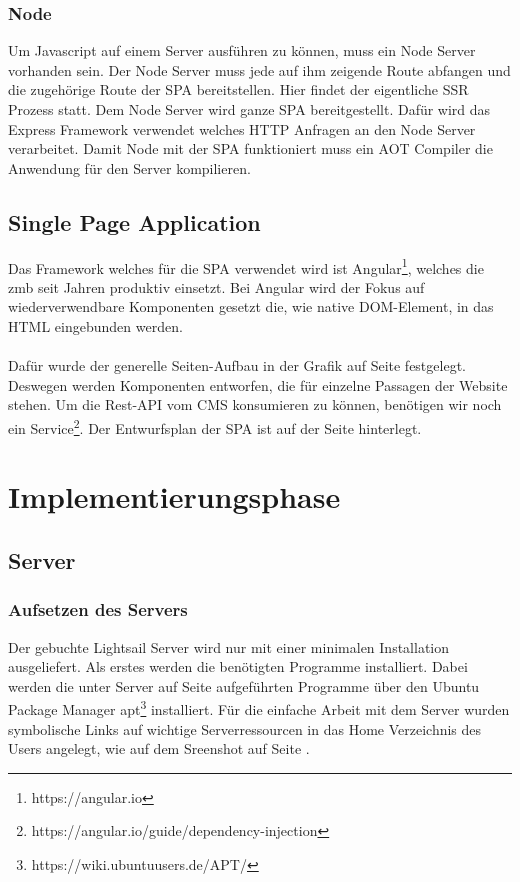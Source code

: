 \documentclass[11pt,a4paper]{article}
\begin{document}
\subsubsection{Node}
Um Javascript auf einem Server ausführen zu können, muss ein Node Server vorhanden sein.
Der Node Server muss jede auf ihm zeigende Route abfangen und die zugehörige Route der SPA bereitstellen. Hier findet der eigentliche SSR Prozess statt. Dem Node Server wird ganze SPA bereitgestellt. Dafür wird das Express Framework verwendet welches HTTP Anfragen an den Node Server verarbeitet. Damit Node mit der SPA funktioniert muss ein \acs{AOT} Compiler die Anwendung für den Server kompilieren.
\subsection{Single Page Application}
Das Framework welches für die SPA verwendet wird ist Angular\footnote{https://angular.io}, welches die zmb seit Jahren produktiv einsetzt. Bei Angular wird der Fokus auf wiederverwendbare Komponenten gesetzt die, wie native DOM-Element, in das HTML eingebunden werden.\\\\
Dafür wurde der generelle Seiten-Aufbau in der Grafik auf Seite \pageref{sec:epage}
festgelegt. Deswegen werden Komponenten entworfen, die für einzelne Passagen der Website stehen.
Um die Rest-API vom CMS konsumieren zu können, benötigen wir noch ein Service\footnote{https://angular.io/guide/dependency-injection}.
Der Entwurfsplan der SPA ist auf der Seite \pageref{sec:espa} hinterlegt.
\section{Implementierungsphase}
\subsection{Server}
\subsubsection{Aufsetzen des Servers}
Der gebuchte Lightsail Server wird nur mit einer minimalen Installation ausgeliefert. Als erstes werden die benötigten Programme installiert. Dabei werden die unter Server auf Seite \pageref{sec:progs} aufgeführten Programme über den Ubuntu Package Manager apt\footnote{https://wiki.ubuntuusers.de/APT/} installiert. Für die einfache Arbeit mit dem Server wurden symbolische Links auf wichtige Serverressourcen in das Home Verzeichnis des Users angelegt, wie auf dem Sreenshot auf Seite \pageref{sec:ordner} .
\end{document}
